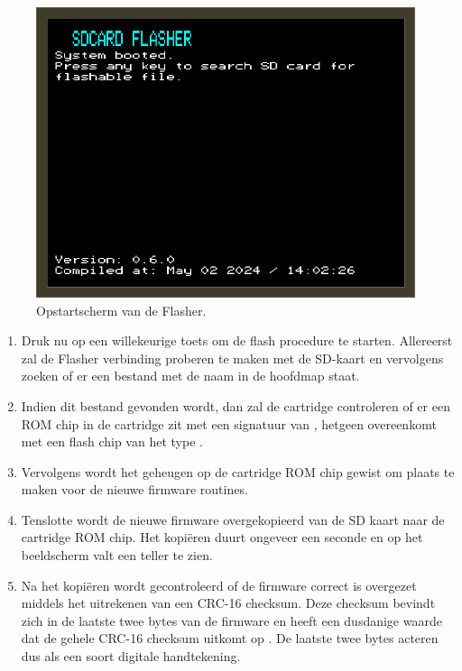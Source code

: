\begin{figure}[h!]
    \centering
    \includegraphics[width=0.99\textwidth]{img/flasher_boot.png}
    \caption{Opstartscherm van de Flasher.}
    \label{fig:flasher-boot}
\end{figure}

\begin{enumerate}
    \item Druk nu op een willekeurige toets om de flash procedure te starten. Allereerst zal de Flasher verbinding proberen te maken met de SD-kaart en vervolgens zoeken of er een bestand met de naam  in de hoofdmap staat.
    \item Indien dit bestand gevonden wordt, dan zal de cartridge controleren of er een ROM chip in de cartridge zit met een signatuur van , hetgeen overeenkomt met een flash chip van het type .
    \item Vervolgens wordt het geheugen  op de cartridge ROM chip gewist om plaats te maken voor de nieuwe firmware routines.
    \item Tenslotte wordt de nieuwe firmware overgekopieerd van de SD kaart naar de cartridge ROM chip. Het kopiëren duurt ongeveer een seconde en op het beeldscherm valt een teller te zien.
    \item Na het kopiëren wordt gecontroleerd of de firmware correct is overgezet middels het uitrekenen van een CRC-16 checksum. Deze checksum bevindt zich in de laatste twee bytes van de firmware en heeft een dusdanige waarde dat de gehele CRC-16 checksum uitkomt op . De laatste twee bytes acteren dus als een soort digitale handtekening.
\end{enumerate}


